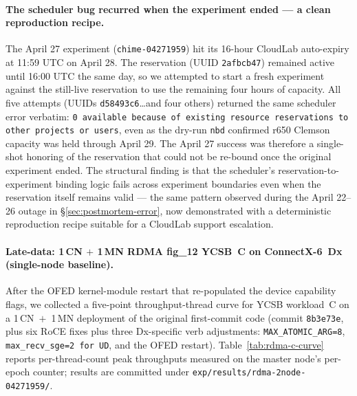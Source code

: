 \documentclass[11pt,a4paper]{article}
\begin{document}
\paragraph{The scheduler bug recurred when the experiment ended --- a clean reproduction recipe.} The April 27 experiment (\texttt{chime-04271959}) hit its 16-hour CloudLab auto-expiry at 11:59 UTC on April 28. The reservation (UUID \texttt{2afbcb47}) remained active until 16:00 UTC the same day, so we attempted to start a fresh experiment against the still-live reservation to use the remaining four hours of capacity. All five attempts (UUIDs \texttt{d58493c6}\ldots and four others) returned the same scheduler error verbatim: \texttt{0 available because of existing resource reservations to other projects or users}, even as the dry-run \texttt{nbd} confirmed r650 Clemson capacity was held through April 29. The April 27 success was therefore a single-shot honoring of the reservation that could not be re-bound once the original experiment ended. The structural finding is that the scheduler's reservation-to-experiment binding logic fails across experiment boundaries even when the reservation itself remains valid --- the same pattern observed during the April 22--26 outage in §\ref{sec:postmortem-error}, now demonstrated with a deterministic reproduction recipe suitable for a CloudLab support escalation.

\paragraph{Late-data: 1\,CN $+$ 1\,MN RDMA fig\_12 YCSB~C on ConnectX-6~Dx (single-node baseline).} After the OFED kernel-module restart that re-populated the device capability flags, we collected a five-point throughput-thread curve for YCSB workload~C on a 1\,CN~$+$~1\,MN deployment of the original first-commit code (commit \texttt{8b3e73e}, plus six RoCE fixes plus three Dx-specific verb adjustments: \texttt{MAX\_ATOMIC\_ARG=8}, \texttt{max\_recv\_sge=2 for UD}, and the OFED restart). Table~\ref{tab:rdma-c-curve} reports per-thread-count peak throughputs measured on the master node's per-epoch counter; results are committed under \texttt{exp/results/rdma-2node-04271959/}.
\end{document}
